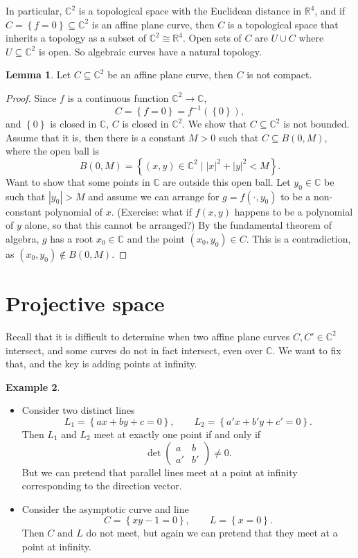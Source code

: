 \documentclass{article}
\newcommand{\R}{\mathbb{R}}
\newcommand{\C}{\mathbb{C}}
\newcommand{\rb}[1]{\left( #1 \right)}
\newcommand{\cb}[1]{\left\{ #1 \right\}}
\newcommand{\abs}[1]{\left\lvert #1 \right\rvert}
\newcommand{\two}[2]{\begin{pmatrix} #1 \\ #2 \end{pmatrix}}
\theoremstyle{definition}\newtheorem{definition}{Definition}[section]
\theoremstyle{definition}\newtheorem{notation}[definition]{Notation}
\theoremstyle{definition}\newtheorem{remark}[definition]{Remark}
\theoremstyle{definition}\newtheorem{example1}[definition]{Example}
\theoremstyle{definition}\newtheorem{fact}{Fact}
\theoremstyle{definition}\newtheorem{exercise}{Exercise}
\theoremstyle{definition}\newtheorem*{example2}{Example}
\newtheorem{lemma}[definition]{Lemma}
\begin{document}
In particular, $ \C^2 $ is a topological space with the Euclidean distance in $ \R^4 $, and if $ C = \cb{f = 0} \subseteq \C^2 $ is an affine plane curve, then $ C $ is a topological space that inherits a topology as a subset of $ \C^2 \cong \R^4 $. Open sets of $ C $ are $ U \cup C $ where $ U \subseteq \C^2 $ is open. So algebraic curves have a natural topology.

\begin{lemma}
Let $ C \subseteq \C^2 $ be an affine plane curve, then $ C $ is not compact.
\end{lemma}

\begin{proof}
Since $ f $ is a continuous function $ \C^2 \to \C $,
$$ C = \cb{f = 0} = f^{-1}\rb{\cb{0}}, $$
and $ \cb{0} $ is closed in $ \C $, $ C $ is closed in $ \C^2 $. We show that $ C \subseteq \C^2 $ is not bounded. Assume that it is, then there is a constant $ M > 0 $ such that $ C \subseteq B\rb{0, M} $, where the open ball is
$$ B\rb{0, M} = \cb{\rb{x, y} \in \C^2 \mid \abs{x}^2 + \abs{y}^2 < M}. $$
Want to show that some points in $ \C $ are outside this open ball. Let $ y_0 \in \C $ be such that $ \abs{y_0} > M $ and assume we can arrange for $ g = f\rb{\cdot, y_0} $ to be a non-constant polynomial of $ x $. (Exercise: what if $ f\rb{x, y} $ happens to be a polynomial of $ y $ alone, so that this cannot be arranged?) By the fundamental theorem of algebra, $ g $ has a root $ x_0 \in \C $ and the point $ \rb{x_0, y_0} \in C $. This is a contradiction, as $ \rb{x_0, y_0} \notin B\rb{0, M} $.
\end{proof}

\pagebreak


\section{Projective space}

Recall that it is difficult to determine when two affine plane curves $ C, C' \in \C^2 $ intersect, and some curves do not in fact intersect, even over $ \C $. We want to fix that, and the key is adding points at infinity.

\begin{example1}
\hfill
\begin{itemize}
\item Consider two distinct lines
$$ L_1 = \cb{ax + by + c = 0}, \qquad L_2 = \cb{a'x + b'y + c' = 0}. $$
Then $ L_1 $ and $ L_2 $ meet at exactly one point if and only if
$$ \det\two{a & b}{a' & b'} \ne 0. $$
But we can pretend that parallel lines meet at a point at infinity corresponding to the direction vector.
\item Consider the asymptotic curve and line
$$ C = \cb{xy - 1 = 0}, \qquad L = \cb{x = 0}. $$
Then $ C $ and $ L $ do not meet, but again we can pretend that they meet at a point at infinity.
\end{itemize}
\end{example1}
\end{document}
